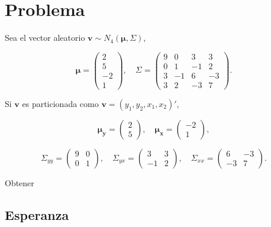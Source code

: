 
\newpage


\section{Problema}

Sea el vector aleatorio $\mathbf{v} \sim N_4(\boldsymbol{\mu}, \Sigma)$,

$$\boldsymbol{\mu} = 
\begin{pmatrix} 
2 \\ 
5 \\ 
-2 \\ 
1 
\end{pmatrix}, 
\quad 
\Sigma = 
\begin{pmatrix} 
9 & 0 & 3 & 3 \\ 
0 & 1 & -1 & 2 \\ 
3 & -1 & 6 & -3 \\ 
3 & 2 & -3 & 7 
\end{pmatrix}.$$

Si $\mathbf{v}$ es particionada como $\mathbf{v} = (y_1, y_2, x_1, x_2)'$,

$$
\mathbf{\mu_y} = 
\begin{pmatrix} 
2 \\ 
5 
\end{pmatrix}, 
\quad 
\mathbf{\mu_x} = 
\begin{pmatrix} 
-2 \\ 
1 
\end{pmatrix}, 
$$

$$
\Sigma_{yy} = 
\begin{pmatrix} 
9 & 0 \\ 
0 & 1 
\end{pmatrix}, 
\quad 
\Sigma_{yx} = 
\begin{pmatrix} 
3 & 3 \\ 
-1 & 2 
\end{pmatrix}, 
\quad 
\Sigma_{xx} = 
\begin{pmatrix} 
6 & -3 \\ 
-3 & 7 
\end{pmatrix}. 
$$

Obtener


\subsection{Esperanza}

